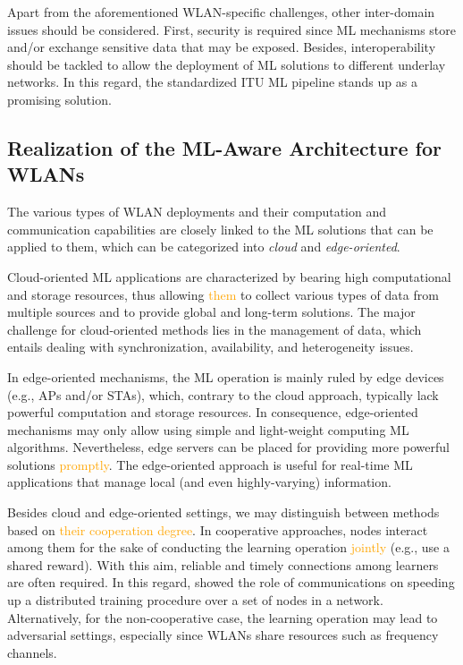 \documentclass[journal]{IEEEtran}
\begin{document}
Apart from the aforementioned WLAN-specific challenges, other inter-domain issues should be considered. First, security is required since ML mechanisms store and/or exchange sensitive data that may be exposed. Besides, interoperability should be tackled to allow the deployment of ML solutions to different underlay networks. In this regard, the standardized ITU ML pipeline stands up as a promising solution.

\subsection{Realization of the ML-Aware Architecture for WLANs}
The various types of WLAN deployments and their computation and communication capabilities are closely linked to the ML solutions that can be applied to them, which can be categorized into \emph{cloud} and \emph{edge-oriented}. 

Cloud-oriented ML applications are characterized by
bearing high computational and storage resources, thus allowing \textcolor{orange}{them} to collect various types of data from multiple sources and to provide global and long-term solutions. The major challenge for cloud-oriented methods lies in the management of data, which entails dealing with synchronization, availability, and heterogeneity issues.

In edge-oriented mechanisms, the ML operation is mainly ruled by edge devices (e.g., APs and/or STAs), which, contrary to the cloud approach, typically lack powerful computation and storage resources. In consequence, edge-oriented mechanisms may only allow using simple and light-weight computing ML algorithms. Nevertheless, edge servers can be placed for providing more powerful solutions \textcolor{orange}{promptly}. The edge-oriented approach is useful for real-time ML applications that manage local (and even highly-varying) information.

Besides cloud and edge-oriented settings, we may distinguish between methods based on \textcolor{orange}{their cooperation degree}. In cooperative approaches, nodes interact among them for the sake of conducting the learning operation \textcolor{orange}{jointly} (e.g., use a shared reward). With this aim, reliable and timely connections among learners are often required. In this regard, \cite{lin2017deep} showed the role of communications on speeding up a distributed training procedure over a set of nodes in a network. Alternatively, for the non-cooperative case, the learning operation may lead to adversarial settings, especially since WLANs share resources such as frequency channels.
\end{document}
